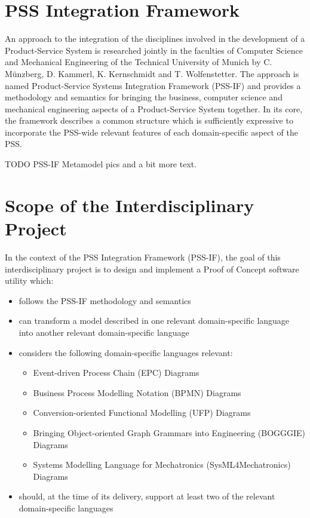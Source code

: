 \section*{PSS Integration Framework}

An approach to the integration of the disciplines involved in the development of a Product-Service System is researched jointly in the faculties of Computer Science and Mechanical Engineering of the Technical University of Munich by C. M\"unzberg, D. Kammerl, K. Kernschmidt and T. Wolfenstetter. The approach is named Product-Service Systems Integration Framework (PSS-IF) and provides a methodology and semantics for bringing the business, computer science and mechanical engineering aspects of a Product-Service System together. In its core, the framework describes a common structure which is sufficiently expressive to incorporate the PSS-wide relevant features of each domain-specific aspect of the PSS.

\color{red}TODO PSS-IF Metamodel pics and a bit more text.\color{black}

\section*{Scope of the Interdisciplinary Project}

In the context of the PSS Integration Framework (PSS-IF), the goal of this interdisciplinary project is to design and implement a Proof of Concept software utility which:

\begin{itemize}
\item follows the PSS-IF methodology and semantics
\item can transform a model described in one relevant domain-specific language into another relevant domain-specific language
\item considers the following domain-specific languages relevant:
	\begin{itemize}
	\item Event-driven Process Chain (EPC) Diagrams
	\item Business Process Modelling Notation (BPMN) Diagrams
	\item Conversion-oriented Functional Modelling (UFP) Diagrams
	\item Bringing Object-oriented Graph Grammars into Engineering (BOGGGIE) Diagrams
	\item Systems Modelling Language for Mechatronics (SysML4Mechatronics) Diagrams
	\end{itemize}
\item should, at the time of its delivery, support at least two of the relevant domain-specific languages
\end{itemize} 

